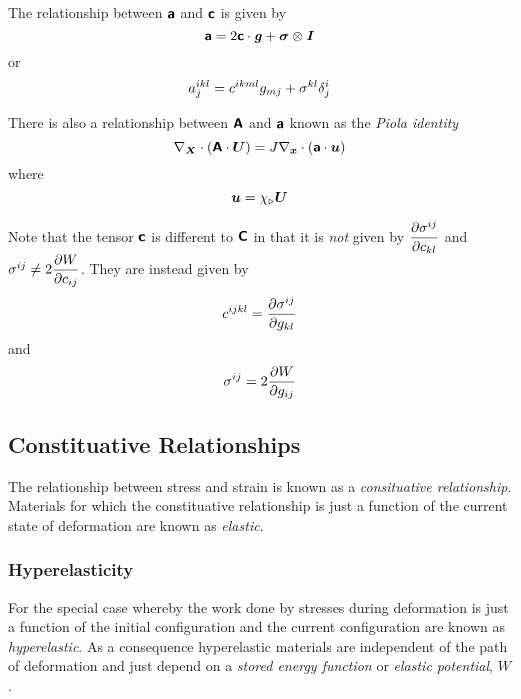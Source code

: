 The relationship between $\boldsymbol{\mathsf{a}}$ and $\boldsymbol{\mathsf{c}}$ is given by
\begin{equation}
  \boldsymbol{\mathsf{a}}=2 \boldsymbol{\mathsf{c}}  \cdot  \boldsymbol{\mathit{g}} + \boldsymbol{\mathit{\sigma}} \otimes \boldsymbol{\mathit{I}} 
\end{equation}
or
\begin{equation}
  a^{ikl}_{j}=c^{ikml}g_{mj}+\sigma^{kl} \delta^{i}_{j} 
\end{equation}

There is also a relationship between $\boldsymbol{\mathsf{A}}$ and $\boldsymbol{\mathsf{a}}$
known as the \emph{Piola identity} \ie
\begin{equation}
  \divergence{\vectr{X}}{\pbrac{\dotprod{\tensorfour{A}}{\vectr{U}}}}=
  J\divergence{\vectr{x}}{\pbrac{\dotprod{\tensorfour{a}}{\vectr{u}}}}
\end{equation}
where
\begin{equation}
   \boldsymbol{u} = \chi_{\triangleright} \boldsymbol{U}  
\end{equation}

Note that the tensor $\boldsymbol{\mathsf{c}}$ is different to $\boldsymbol{\mathsf{C}}$ in that
it is \emph{not} given by $ \dfrac{\partial \sigma^{ij}}{\partial c_{kl}} $ and $\sigma^{ij}\neq
2 \dfrac{\partial W}{\partial c_{ij}} $. They are instead given by
\begin{equation}
  c^{ijkl}= \dfrac{\partial \sigma^{ij}}{\partial g_{kl}} 
\end{equation}
and
\begin{equation}
  \sigma^{ij}=2 \dfrac{\partial W}{\partial g_{ij}} 
\end{equation}

\subsection{Constituative Relationships}

The relationship between stress and strain is known as a \emph{consituative
  relationship}. Materials for which the constituative relationship is just a
function of the current state of deformation are known as \emph{elastic}.

\subsubsection{Hyperelasticity}

For the special case whereby the work done by stresses during deformation is
just a function of the initial configuration and the current configuration are
known as \emph{hyperelastic}. As a consequence hyperelastic materials are
independent of the path of deformation and just depend on a \emph{stored
  energy function} or \emph{elastic potential}, $W$.

